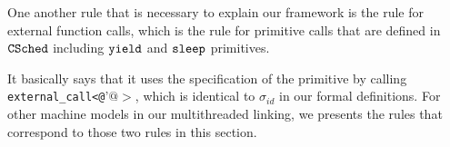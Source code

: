 One another rule that is necessary to explain our framework is the rule for external function calls,
which is the rule for primitive calls that are defined in ${{\mathrm{\texttt{CSched}}}}$ including ${\mathrm{\texttt{yield}}}$ and ${\mathrm{\texttt{sleep}}}$ primitives.

It basically says that it uses 
the specification of the primitive by calling \lstinline$external_call<@$'$@>$,
which is identical to $\sigma_{id}$ in our formal definitions.  
For other machine models in our multithreaded linking,
we presents the rules that correspond to those two rules in this section. 


%
%
